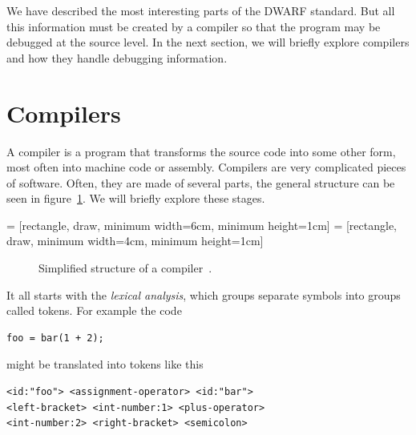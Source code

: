 We have described the most interesting parts of the DWARF standard. But all
this information must be created by a compiler so that the program may be
debugged at the source level. In the next section, we will briefly explore
compilers and how they handle debugging information.

\section{Compilers}
A compiler is a program that transforms the source code into some other form,
most often into machine code or assembly. Compilers are very complicated pieces
of software. Often, they are made of several parts, the general structure can
be seen in figure~\ref{fig:compiler-structure}. We will briefly explore these
stages.

 = [rectangle, draw, minimum width=6cm, minimum height=1cm] 
 = [rectangle, draw, minimum width=4cm, minimum height=1cm] 
\begin{figure}
    {\centering
    \par}
    \caption{Simplified structure of a compiler~\cite{dragon-book}.}
    \label{fig:compiler-structure}
\end{figure}

It all starts with the \textit{lexical analysis}, which groups separate symbols
into groups called tokens. For example the code
\begin{verbatim}
foo = bar(1 + 2);
\end{verbatim}
might be translated into tokens like this
\begin{lstlisting}[stringstyle=\color{black}]
<id:"foo"> <assignment-operator> <id:"bar"> 
<left-bracket> <int-number:1> <plus-operator> 
<int-number:2> <right-bracket> <semicolon>
\end{lstlisting}

